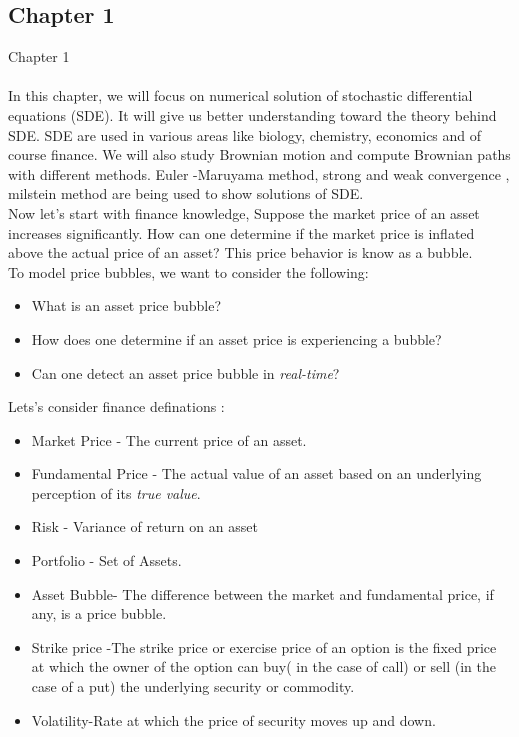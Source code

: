 
\subsection{Chapter 1}
 Chapter 1\\\\
 In this chapter, we will focus on numerical solution of stochastic differential equations (SDE). It will give us better understanding toward the theory behind SDE. SDE are used in various areas like biology, chemistry, economics and of course finance. We will also study Brownian motion and compute Brownian paths with different methods. Euler -Maruyama method, strong and weak convergence , milstein method are being used to show solutions of SDE. \\
 Now let's start with finance knowledge, Suppose the market price of an asset increases significantly.  How can one determine if the market price is inflated
above the actual price of an asset? This price behavior is know as a bubble.\\
To model price bubbles, we want to consider the following:
\begin{itemize}
\item What is an asset price bubble?
\item How does one determine if an asset price is experiencing a bubble?
\item Can one detect an asset price bubble in \textit{real-time}?
\end{itemize}
Lets's consider finance definations :\\
\begin{itemize}
\item Market Price - The current price of an asset.
\item Fundamental Price - The actual value of an asset based on an underlying perception of its \textit{true value}.
\item Risk - Variance of return on an asset 
\item Portfolio - Set of Assets.

\item Asset Bubble- The difference between the market and fundamental price, if any, is a price bubble.
 
 \item Strike price -The strike price or exercise price of an option is the fixed price at which the owner of the option can buy( in the case of call) or sell (in the case of a put) the underlying security or commodity.

\item Volatility-Rate at which the price of security moves up and down.
\end{itemize} 
